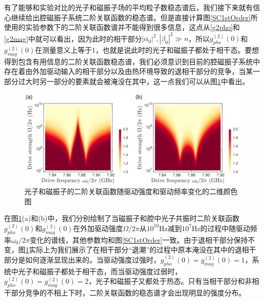 有了能够和实验对比的光子和磁振子场的平均粒子数稳态谱后，我们接下来就有信心继续给出腔磁振子系统二阶关联函数的稳态谱。但是直接计算图\ref{SC1stOrder}所使用的实验参数下的二阶关联函数谱并不能得到很多信息，这点从\eqref{g2pho}和\eqref{g2mag}中就可以看出，因为此时的相干部分$|\overline{\alpha_{0}}|^{2},|\overline{\beta_{0}}|^{2} \gg n$，所以$g_{pho}^{(2)}(0)$和$g_{mag}^{(2)}(0)$在测量意义上等于1，也就是说此时的光子和磁振子都处于相干态。要想得到包含有用信息的二阶关联函数稳态谱，我们必须意识到目前的腔磁振子系统中存在着由外加驱动输入的相干部分以及由热环境导致的退相干部分的竞争，当某一部分过大时另一部分的要素就会被淹没在其中，这一点我们可以从图\ref{CoherentVary2edOrder}中看出。
\begin{figure}[htbp]
	\centering
	\includegraphics[width=2\basefigurewidth,clip]{./figure/4_2}
	\caption{光子和磁振子的二阶关联函数随驱动强度和驱动频率变化的二维颜色图} 
	\label{CoherentVary2edOrder}
\end{figure}
在图\ref{CoherentVary2edOrder}(a)和(b)中，我们分别绘制了当磁振子和腔中光子共振时二阶关联函数$g_{pho}^{(2)}(0)$和$g_{mag}^{(2)}(0)$在外加驱动强度$\Omega/2\pi$从$10^{10}$Hz减到$10^{7}$Hz的过程中随驱动频率$\omega_0/2\pi$变化的谱线，其他参数均和图\ref{SC1stOrder}一致。由于退相干部分保持不变，图\ref{CoherentVary2edOrder}实际上为我们展示了在相干部分“退潮”的过程中原本淹没在其中的退相干部分是如何逐渐显现出来的。当驱动强度过强时，$g_{pho}^{(2)}(0)=g_{mag}^{(2)}(0)=1$，系统中光子和磁振子都处于相干态，而当驱动强度过弱时，$g_{pho}^{(2)}(0)=g_{mag}^{(2)}(0)=2$，光子和磁振子又都处于热态。只有当相干部分和非相干部分竞争的不相上下时，二阶关联函数的稳态谱才会出现明显的强度分布。

